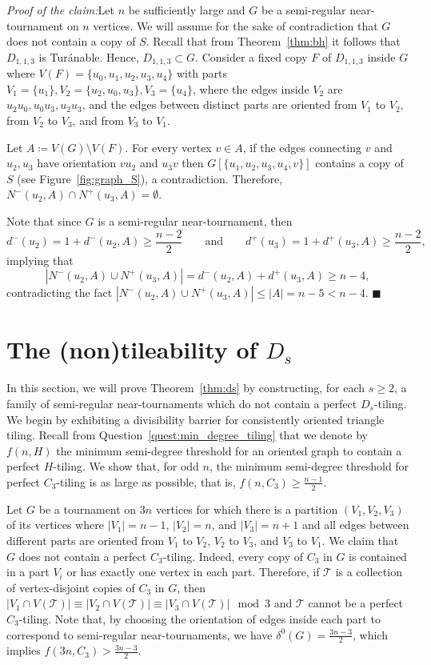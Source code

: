 \documentclass[11pt]{amsart}
\newcommand{\CT}{\mathcal{T}}
\newenvironment{claimproof}[1]{\par\noindent\textit{Proof of the claim:}\space#1}{\leavevmode\unskip\penalty9999 \hbox{}\nobreak\hfill\quad\hbox{$\blacksquare$}}
\begin{document}
\begin{claimproof}
    Let $n$ be sufficiently large and $G$ be a semi-regular near-tournament on $n$ vertices. We will assume for the sake of contradiction that $G$ does not contain a copy of $S$.
    Recall that from Theorem~\ref{thm:bh} it follows that $D_{1,1,3}$ is Tur\'anable.
    Hence, $D_{1,1,3} \subset G$. Consider a fixed copy $F$ of $D_{1,1,3}$ inside $G$ where $V(F)=\{u_0, u_1, u_2, u_3, u_4\}$ with parts $V_1 = \{u_1\}, V_2 = \{u_2, u_0, u_3\}, V_3 = \{u_4\}$, where the edges inside $V_2$ are $u_2u_0, u_0u_3, u_2u_3$, and the edges between distinct parts are oriented from $V_1$ to $V_2$, from $V_2$ to $V_3$, and from $V_3$ to $V_1$.
    
    Let $A\coloneqq V(G) \setminus V(F)$. For every vertex $v \in A$, if the edges connecting $v$ and $u_2, u_3$ have orientation $vu_2$ and $u_3v$ then $G[\{u_1, u_2, u_3, u_4, v\}]$ contains a copy of $S$ (see Figure~\ref{fig:graph_S}), a contradiction. Therefore, $N^-(u_2, A) \cap N^+(u_3, A) = \emptyset$.
        
    Note that since $G$ is a semi-regular near-tournament, then
    $$d^-(u_2) = 1 + d^-(u_2, A) \ge \frac{n-2}{2} \qquad \text{and} \qquad 
    d^+(u_3) = 1 + d^+(u_3, A) \ge \frac{n-2}{2} ,$$
    implying that
    $$ |N^-(u_2, A) \cup N^+(u_3, A)| = d^-(u_2, A) + d^+(u_3, A) \ge n-4 ,$$
    contradicting the fact $|N^-(u_2, A) \cup N^+(u_3, A)| \le |A| = n-5 < n-4$.
\end{claimproof}


\section{The (non)tileability of $D_s$} \label{sec:ds}

In this section, we will prove Theorem~\ref{thm:ds} by constructing, for each $s\ge 2$, a family of semi-regular near-tournaments which do not contain a perfect $D_s$-tiling. 
We begin by exhibiting a divisibility barrier for consistently oriented triangle tiling. 
Recall from Question~\ref{quest:min_degree_tiling} that we denote by $f(n,H)$ the minimum semi-degree threshold for an oriented graph to contain a perfect $H$-tiling.
We show that, for odd $n$, the minimum semi-degree threshold for perfect $C_3$-tiling is as large as possible, that is, $f(n,C_3) \ge \frac{n-1}{2}$. 

Let $G$ be a tournament on $3n$ vertices for which there is a partition $(V_1, V_2, V_3)$ of its vertices where $|V_1|=n-1$, $|V_2|=n$, and $|V_3|=n+1$ and all edges between different parts are oriented from $V_1$ to $V_2$, $V_2$ to $V_3$, and $V_3$ to $V_1$. 
We claim that $G$ does not contain a perfect $C_3$-tiling. Indeed, every copy of $C_3$ in $G$ is contained in a part $V_i$ or has exactly one vertex in each part. Therefore, if $\CT$ is a collection of vertex-disjoint copies of $C_3$ in $G$, then 
$|V_1 \cap V(\CT)| \equiv |V_2 \cap V(\CT)| \equiv |V_3 \cap V(\CT)| \mod 3$ 
and $\CT$ cannot be a perfect $C_3$-tiling.
Note that, by choosing the orientation of edges inside each part to correspond to semi-regular near-tournaments, we have $\delta^0(G) = \frac{3n-3}{2}$, which implies $f(3n,C_3)>\frac{3n-3}{2}$. 
\end{document}
